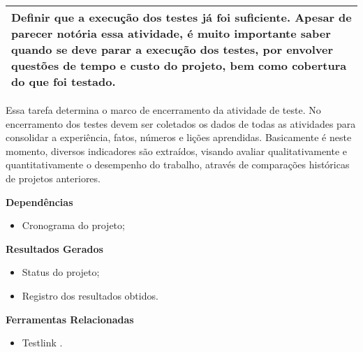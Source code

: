 \begin{table}[H]
\centering
\begin{tabular}{|p{130mm}|}
\hline
Definir que a execução dos testes já foi suficiente. Apesar de parecer notória essa atividade, é muito importante saber quando se deve parar a execução dos testes, por envolver questões de tempo e custo do   projeto, bem como cobertura do que foi testado. \\ 
\hline
\end{tabular}
\end{table}

Essa tarefa determina o marco de encerramento da atividade de teste. No encerramento dos testes devem ser coletados os dados de todas as atividades para consolidar a experiência, fatos, números e lições aprendidas. Basicamente é neste momento, diversos indicadores são extraídos, visando avaliar qualitativamente e quantitativamente o desempenho do trabalho, através de comparações históricas de projetos anteriores.

\textbf{Dependências}
\begin{itemize}
    \item Cronograma do projeto;
\end{itemize}

\textbf{Resultados Gerados}
\begin{itemize}
    \item Status do projeto;
    \item Registro dos resultados obtidos.
\end{itemize}

\textbf{Ferramentas Relacionadas}
\begin{itemize}
    \item Testlink \cite{TestLink}.
\end{itemize}



